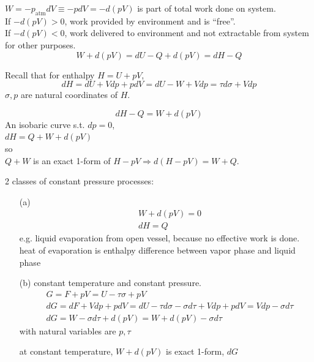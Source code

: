\documentclass[twoside]{amsart}
\theoremstyle{plain}
\theoremstyle{definition}
\begin{document}

$W = -p_{\text{atm}}dV \equiv - pdV = -d(pV)$ is part of total work done on system.  \\

If $-d(pV) >0$, work provided by environment and is ``free''.  \\
If $-d(pV)<0$, work delivered to environment and not extractable from system for other purposes.  \\
\[
W + d(pV) = dU- Q + d(pV) = dH-Q
\]

Recall that for enthalpy $H = U+pV$, 
\[
dH = dU + Vdp + pdV = dU - W + Vdp = \tau d\sigma + Vdp 
\]
$\sigma, p$ are natural coordinates of $H$.  

\[
dH - Q = W + d(pV)
\]
An isobaric curve s.t. $dp=0$, \\
$dH = Q + W + d(pV)$ \\
so \\
$Q+W$ is an exact 1-form of $H-pV \Longrightarrow d(H-pV) = W+Q$.  

2 classes of constant pressure processes:
\begin{enumerate}
\item[(a)] \[
\begin{aligned} 
  & W + d(pV) = 0 \\
  & dH = Q \end{aligned}
\]
e.g. liquid evaporation from open vessel, because no effective work is done.  \\
heat of evaporation is enthalpy difference between vapor phase and liquid phase
\item[(b)] constant temperature and constant pressure.  
\[
\begin{aligned}
&  G = F + pV = U-\tau \sigma + pV \\ 
& dG = dF + V dp + p dV = dU - \tau d\sigma - \sigma d\tau + V dp  + p dV = V dp- \sigma d\tau \\
&  dG = W - \sigma d\tau + d(pV) = W + d(pV) - \sigma d\tau
\end{aligned}
\]
with natural variables are $p,\tau$ 

at constant temperature, $W + d(pV)$ is exact 1-form, $dG$  
\end{enumerate}
\end{document}
